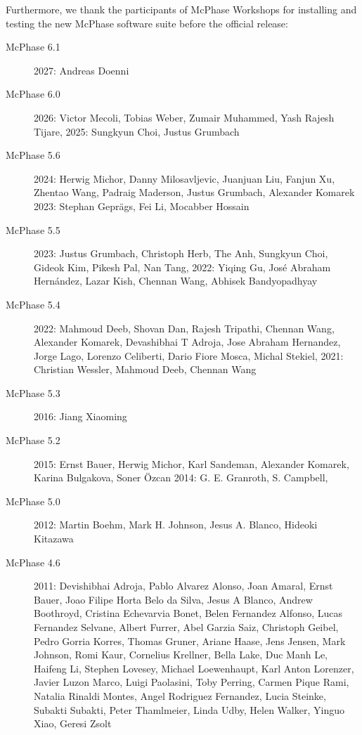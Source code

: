 \documentclass[twoside]{article}
\begin{document}
Furthermore, we thank the participants of McPhase Workshops for installing and
testing the new McPhase software suite before the official release:

\begin{description}
\item[McPhase 6.1]
   2027: Andreas Doenni
\item[McPhase 6.0]
   2026: Victor Mecoli, Tobias Weber, Zumair Muhammed, Yash Rajesh Tijare, 
   2025: Sungkyun Choi, Justus Grumbach
\item[McPhase 5.6]
   2024: Herwig Michor, Danny Milosavljevic, Juanjuan Liu, Fanjun Xu, 
      Zhentao Wang, Padraig Maderson, Justus Grumbach, Alexander Komarek
   2023: Stephan Geprägs, Fei Li, Mocabber Hossain
\item[McPhase 5.5]
   2023: Justus Grumbach, Christoph Herb, The Anh, Sungkyun Choi, Gideok Kim, Pikesh Pal, Nan Tang,
   2022: Yiqing Gu, José Abraham Hernández, Lazar Kish, Chennan Wang, Abhisek Bandyopadhyay
\item[McPhase 5.4]
   2022: Mahmoud Deeb, Shovan Dan, Rajesh Tripathi, Chennan Wang, Alexander Komarek, 
        Devashibhai T Adroja, Jose Abraham Hernandez, Jorge Lago, Lorenzo Celiberti, Dario Fiore Mosca,
        Michal Stekiel,
   2021: Christian Wessler, Mahmoud Deeb, Chennan Wang
\item[McPhase 5.3]
   2016: Jiang Xiaoming
\item[McPhase 5.2]
   2015: Ernst Bauer, Herwig Michor, Karl Sandeman, Alexander Komarek, Karina Bulgakova,
         Soner Özcan
   2014: G. E. Granroth, S. Campbell, 
\item[McPhase 5.0]
   2012: Martin Boehm, Mark H. Johnson, Jesus A. Blanco, Hideoki Kitazawa
\item[McPhase 4.6]
   2011: Devishibhai Adroja, Pablo Alvarez Alonso, Joan Amaral, Ernst Bauer,
         Joao Filipe Horta Belo da Silva, Jesus A Blanco, Andrew Boothroyd,
         Cristina Echevarvia Bonet, Belen Fernandez Alfonso, Lucas Fernandez Selvane,
         Albert Furrer, Abel Garzia Saiz, Christoph Geibel, Pedro Gorria Korres,
         Thomas Gruner, Ariane Haase, Jens Jensen, Mark Johnson, Romi Kaur, Cornelius Krellner,
         Bella Lake, Duc Manh Le, Haifeng Li, Stephen Lovesey, Michael Loewenhaupt,
         Karl Anton Lorenzer, Javier Luzon Marco, Luigi Paolasini, Toby Perring,
         Carmen Pique Rami, Natalia Rinaldi Montes, Angel Rodriguez Fernandez,
         Lucia Steinke, Subakti Subakti, Peter Thamlmeier, Linda Udby, Helen Walker,
         Yinguo Xiao, Geresi Zsolt
\end{description}
\end{document}
